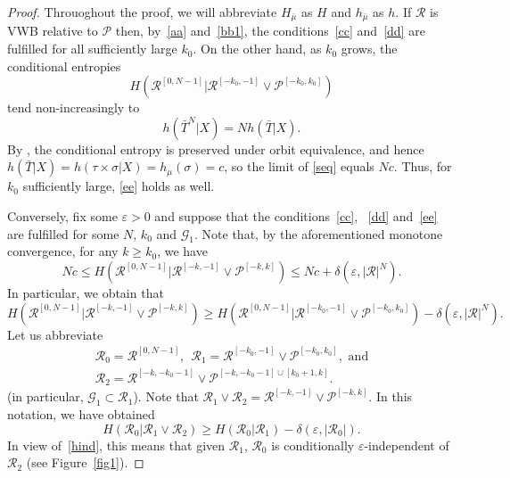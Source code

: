 \documentclass{amsart}
\theoremstyle{remark}
\def \R {\mathcal R}
\def \G {\mathcal G}
\def \P {\mathcal P}
\def \eps {\varepsilon}
\begin{document}
\begin{proof}
Throuoghout the proof, we will abbreviate $H_{\bar\mu}$ as $H$ and $h_{\bar\mu}$ as $h$. If $\R$ is VWB relative to $\P$ then, by~\eqref{aa} and~\eqref{bb1}, the conditions~\eqref{cc} and~\eqref{dd} are fulfilled for all sufficiently large $k_0$. On the other hand, as $k_0$ grows, the conditional entropies
\begin{equation}\label{seq}
H(\R^{[0,N-1]}|\R^{[-k_0,-1]}\vee\P^{[-k_0,k_0]})
\end{equation}
tend non-increasingly to 
$$
h(\bar T^N|X)=Nh(\bar T|X).
$$
By \cite[Theorem~2.6]{13a}, the conditional entropy is preserved under orbit equivalence, and hence $h(\bar T|X)=h(\tau\times\sigma|X)=h_\mu(\sigma)=c$, so the limit of \eqref{seq} equals $Nc$. Thus, for $k_0$ sufficiently large, \eqref{ee} holds as well.

Conversely, fix some $\eps> 0$ and suppose that the conditions~\eqref{cc}, ~\eqref{dd} and~\eqref{ee} are fulfilled for some $N$, $k_0$ and $\G_1$. Note that, by the aforementioned monotone convergence, for any $k\ge k_0$, we have
$$
Nc\le H(\R^{[0,N-1]}|\R^{[-k,-1]}\vee\P^{[-k,k]})\le Nc+\delta(\eps,|\R|^N). 
$$
In particular, we obtain that
$$
H(\R^{[0,N-1]}|\R^{[-k,-1]}\vee\P^{[-k,k]})\ge H(\R^{[0,N-1]}|\R^{[-k_0,-1]}\vee\P^{[-k_0,k_0]})-\delta(\eps,|\R|^N).
$$
Let us abbreviate 
\begin{gather*}
\R_0=\R^{[0,N-1]},\ \ \R_1=\R^{[-k_0,-1]}\vee\P^{[-k_0,k_0]},\text{\ \ and}\\ 
\R_2=\R^{[-k,-k_0-1]}\vee\P^{[-k,-k_0-1]\cup[k_0+1,k]}.
\end{gather*}
(in particular, $\G_1\subset\R_1$).
Note that $\R_1\vee\R_2=\R^{[-k,-1]}\vee\P^{[-k,k]}$.
In this notation, we have obtained
$$
H(\R_0|\R_1\vee\R_2)\ge H(\R_0|\R_1)-\delta(\eps,|\R_0|).
$$
In view of~\eqref{hind}, this means that given $\R_1$, $\R_0$ is conditionally $\eps$-independent of $\R_2$
(see Figure~\ref{fig1}).


\end{proof}
\end{document}
